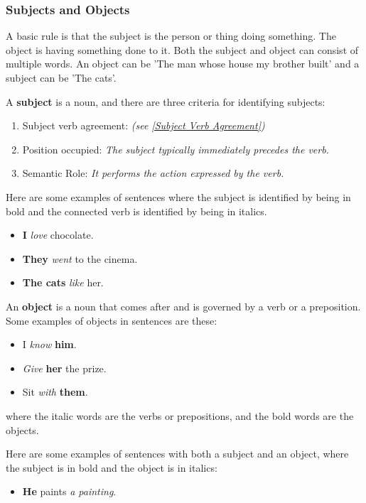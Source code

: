 \subsubsection{Subjects and Objects}
\label{Subjects and Objects}
A basic rule is that the subject is the person or thing doing something. The object is having something done to it. Both the subject and object can consist of multiple words. An object can be 'The man whose house my brother built' and a subject can be 'The cats'.

A \textbf{subject} is a noun, and there are three criteria for identifying subjects:
\begin{enumerate}
    \item Subject verb agreement: \textit{(see \ref{Subject Verb Agreement})}
    \item Position occupied: \textit{The subject typically immediately precedes the verb.}
    \item Semantic Role: \textit{It performs the action expressed by the verb.}
\end{enumerate}

Here are some examples of sentences where the subject is identified by being in bold and the connected verb is identified by being in italics.

\begin{itemize}
    \item \textbf{I} \textit{love} chocolate.
    \item \textbf{They} \textit{went} to the cinema.
    \item \textbf{The cats} \textit{like} her.
\end{itemize}

An \textbf{object} is a noun that comes after and is governed by a verb or a preposition. Some examples of objects in sentences are these:

\begin{itemize}
    \item I \textit{know} \textbf{him}. 
    \item \textit{Give} \textbf{her} the prize.
    \item Sit \textit{with} \textbf{them}.
\end{itemize}

where the italic words are the verbs or prepositions, and the bold words are the objects.

Here are some examples of sentences with both a subject and an object, where the subject is in bold and the object is in italics:

\begin{itemize}
    \item \textbf{He} paints \textit{a painting}.
\end{itemize}